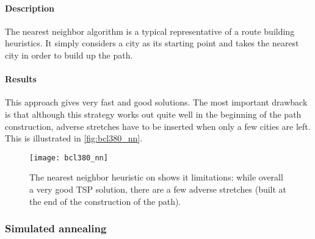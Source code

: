 \documentclass[a4paper,english,11pt,]{scrartcl}
\begin{document}
\paragraph{Description}
The nearest neighbor algorithm is a typical representative of
a route building heuristics. It simply considers a city as its starting point
and takes the nearest city in order to build up the path. 


\paragraph{Results}
This approach gives very fast and good solutions. The most important drawback is that although this strategy works out quite well in the beginning of the path construction, adverse stretches have to be inserted when only a few cities are left. This is illustrated in \autoref{fig:bcl380_nn}.

\begin{figure}[hbpt]
\centering
\texttt{[image: bcl380\_nn]}
\caption[The nearest neighbor heuristic on .]{The nearest neighbor heuristic on  shows it limitations: while overall a very good TSP solution, there are a few adverse stretches (built at the end of the construction of the path).}
\label{fig:bcl380_nn}
\end{figure}

\subsubsection{Simulated annealing}
\end{document}
